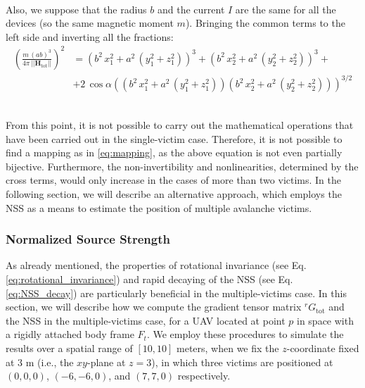 \documentclass[main]{subfiles}
\begin{document}
\noindent\\
Also, we suppose that the radius $b$ and the current $I$ are the same for all the devices (so the same magnetic moment $m$).
Bringing the common terms to the left side and inverting all the fractions:
\[
\begin{aligned}
\left( \frac{m \, (a b)^3}{4 \pi \, || \mathbf{H}_{\text{tot}}||} \right)^2 &= \left( b^2 \, x_1^2 + a^2 \, (y_1^2 + z_1^2) \right)^3 + \left( b^2 \, x_2^2 + a^2 \, (y_2^2 + z_2^2) \right)^3 + \\
& + 2 \, \cos \alpha \left( (b^2 \, x_1^2 + a^2 \, (y_1^2 + z_1^2))(b^2 \, x_2^2 + a^2 \, (y_2^2 + z_2^2)) \right)^{3/2}
\end{aligned}
\]

\noindent\\
From this point, it is not possible to carry out the mathematical operations that 
have been carried out in the single-victim case.
Therefore, it is not possible to find a mapping as in \ref{eq:mapping},
as the above equation is not even partially bijective.
Furthermore, the non-invertibility and nonlinearities, determined by the cross terms,
would only increase in the cases of more than two victims.
In the following section, we will describe an alternative approach, which employs the
NSS as a means to estimate the position of multiple avalanche victims. 

\subsubsection{Normalized Source Strength}
As already mentioned, the properties of rotational invariance (see Eq.\ref{eq:rotational_invariance}) 
and rapid decaying of the NSS (see Eq.\ref{eq:NSS_decay}) are 
particularly beneficial in the multiple-victims case.
In this section, we will describe how we compute the gradient tensor matrix 
${}^r G_{\text{tot}}$ and the NSS in the multiple-victims case,
for a UAV located at point $p$ in space with a rigidly attached body frame $F_t$.
We employ these procedures to simulate the results over a spatial range of $[10, 10]$ meters, 
when we fix the $z$-coordinate fixed at 3 m (i.e., the \( xy \)-plane at \( z = 3 \)), 
in which three victims are positioned at \((0, 0, 0)\), \((-6, -6, 0)\), and \((7, 7, 0)\) respectively.

\end{document}
